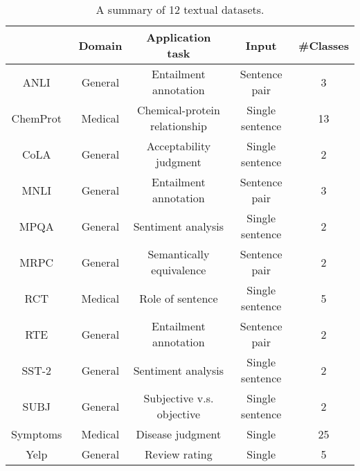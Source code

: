 \begin{table*}[h!]
    \centering
    \small
    \renewcommand{\arraystretch}{1.2} %
    \begin{tabular}{ccccc}
        \toprule
         & Domain & Application task & Input & \#Classes \\
        \midrule
        ANLI~\cite{nie2020adversarial} & General & Entailment annotation & Sentence pair & 3 \\
        ChemProt~\cite{kringelum2016chemprot} & Medical & Chemical-protein relationship & Single sentence & 13 \\
        CoLA~\cite{wang2019glue} & General & Acceptability judgment & Single sentence & 2 \\
        MNLI~\cite{wang2019glue} & General & Entailment annotation & Sentence pair & 3 \\
        MPQA~\cite{wiebe2005annotating} & General & Sentiment analysis & Single sentence & 2 \\
        MRPC~\cite{wang2019glue} & General & Semantically equivalence & Sentence pair & 2 \\
        RCT~\cite{dernoncourt2017pubmed} & Medical & Role of sentence & Single sentence & 5 \\
        RTE~\cite{wang2019glue} & General & Entailment annotation & Sentence pair & 2 \\
        SST-2~\cite{wang2019glue} & General & Sentiment analysis & Single sentence & 2 \\
        SUBJ~\cite{pang2004sentimental} & General & Subjective v.s. objective & Single sentence & 2 \\
        Symptoms~\cite{dai2025auggpt}        
                & Medical & Disease judgment & Single & 25 \\
        Yelp~\cite{zhang2015character} & General & Review rating & Single & 5 \\
        \bottomrule
    \end{tabular}
    \caption{A summary of 12 textual datasets.}
    \label{tab:datasets}
\end{table*}
